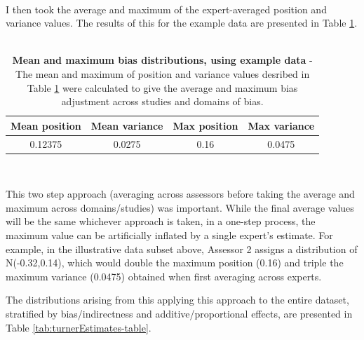 \documentclass[a4paper, twoside]{templates/ociamthesis}
\begin{document}
~

I then took the average and maximum of the expert-averaged position and variance values. The results of this for the example data are presented in Table \ref{tab:addTable3-table}.
~\\




\begin{table}[H]

\caption[Mean and maximum bias distributions, using example data]{\label{tab:addTable3-table}\textbf{Mean and maximum bias distributions, using example data} - The mean and maximum of position and variance values desribed in Table \ref{tab:addTable3-table} were calculated to give the average and maximum bias adjustment across studies and domains of bias.}
\centering
\begin{tabular}[t]{cccc}
\toprule
\textbf{Mean position} & \textbf{Mean variance} & \textbf{Max position} & \textbf{Max variance}\\
\midrule
0.12375 & 0.0275 & 0.16 & 0.0475\\
\bottomrule
\end{tabular}
\end{table}

~

This two step approach (averaging across assessors before taking the average and maximum across domains/studies) was important. While the final average values will be the same whichever approach is taken, in a one-step process, the maximum value can be artificially inflated by a single expert's estimate. For example, in the illustrative data subset above, Assessor 2 assigns a distribution of N(-0.32,0.14), which would double the maximum position (0.16) and triple the maximum variance (0.0475) obtained when first averaging across experts.

The distributions arising from this applying this approach to the entire dataset, stratified by bias/indirectness and additive/proportional effects, are presented in Table \ref{tab:turnerEstimates-table}.

~\\
\end{document}
